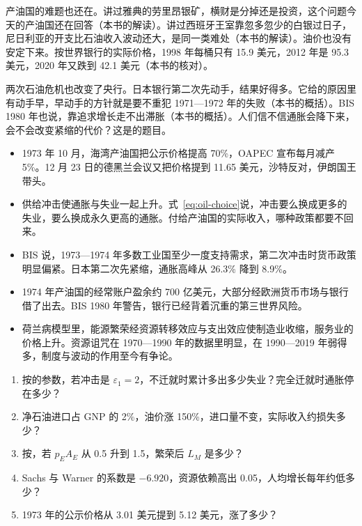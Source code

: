 产油国的难题也还在。讲过雅典的劳里昂银矿，横财是分掉还是投资，这个问题今天的产油国还在回答（本书的解读）。讲过西班牙王室靠忽多忽少的白银过日子，尼日利亚的开支比石油收入波动还大，是同一类难处（本书的解读）\cite{budina2007}。油价也没有安定下来。按世界银行的实际价格，1998 年每桶只有 15.9 美元，2012 年是 95.3 美元，2020 年又跌到 42.1 美元（本书的核对）\cite{pinksheet2026}。

两次石油危机也改变了央行。日本银行第二次先动手，结果好得多。它给的原因里有动手早，早动手的方针就是要不重犯 1971—1972 年的失败（本书的概括）\cite{boj1986}。BIS 1980 年也说，靠追求增长走不出滞胀（本书的概括）\cite{bis1980}。人们信不信通胀会降下来，会不会改变紧缩的代价？这是的题目。

\begin{takeaways}
\begin{itemize}
\item 1973 年 10 月，海湾产油国把公示价格提高 70\%，OAPEC 宣布每月减产 5\%。12 月 23 日的德黑兰会议又把价格提到 11.65 美元，沙特反对，伊朗国王带头。
\item 供给冲击使通胀与失业一起上升。式~\eqref{eq:oil-choice}说，冲击要么换成更多的失业，要么换成永久更高的通胀。付给产油国的实际收入，哪种政策都要不回来。
\item BIS 说，1973—1974 年多数工业国至少一度支持需求，第二次冲击时货币政策明显偏紧。日本第二次先紧缩，通胀高峰从 26.3\% 降到 8.9\%。
\item 1974 年产油国的经常账户盈余约 700 亿美元，大部分经欧洲货币市场与银行借了出去。BIS 1980 年警告，银行已经背着沉重的第三世界风险。
\item 荷兰病模型里，能源繁荣经资源转移效应与支出效应使制造业收缩，服务业的价格上升。资源诅咒在 1970—1990 年的数据里明显，在 1990—2019 年弱得多，制度与波动的作用至今有争论。
\end{itemize}
\end{takeaways}

\begin{selfcheck}
\begin{enumerate}
\item 按的参数，若冲击是 $\varepsilon_1=2$，不迁就时累计多出多少失业？完全迁就时通胀停在多少？
\item 净石油进口占 GNP 的 2\%，油价涨 150\%，进口量不变，实际收入约损失多少？
\item 按，若 $p_EA_E$ 从 0.5 升到 1.5，繁荣后 $L_M$ 是多少？
\item Sachs 与 Warner 的系数是 $-6.920$，资源依赖高出 0.05，人均增长每年约低多少？
\item 1973 年的公示价格从 3.01 美元提到 5.12 美元，涨了多少？
\end{enumerate}
\end{selfcheck}

